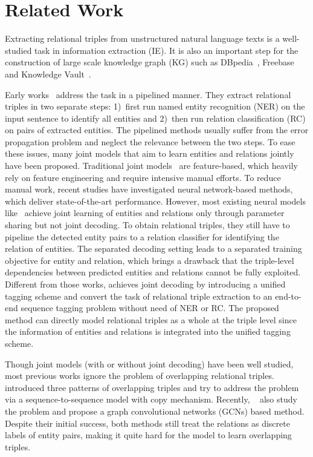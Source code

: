 \documentclass[11pt,a4paper]{article}
\begin{document}
 	
	\section{Related Work}
Extracting relational triples from unstructured natural language texts is a well-studied task in information extraction (IE). It is also an important step for the construction of large scale knowledge graph (KG) such as DBpedia~\citep{auer2007DBpedia}, Freebase~\citep{bollacker2008Freebase} and Knowledge Vault~\citep{dong2014Knowledge}.

\par Early works~\citep{mintz2009Distant,gormley2015Improved} address the task in a pipelined manner. They extract relational triples in two separate steps: 1)~first run named entity recognition (NER) on the input sentence to identify all entities and 2)~then run relation classification (RC) on pairs of extracted entities. The pipelined methods usually suffer from the error propagation problem and neglect the relevance between the two steps.
To ease these issues, many joint models that aim to learn entities and relations jointly have been proposed. Traditional joint models~\citep{yu2010Jointly,li2014Incremental,miwa2014Modeling,ren2017Cotype} are feature-based, which heavily rely on feature engineering and require intensive manual efforts. To reduce manual work, recent studies have investigated neural network-based methods, which deliver state-of-the-art performance. However, most existing neural models like~\citep{miwa2016End} achieve joint learning of entities and relations only through parameter sharing but not joint decoding. To obtain relational triples, they still have to pipeline the detected entity pairs to a relation classifier for identifying the relation of entities. The separated decoding setting leads to a separated training objective for entity and relation, which brings a drawback that the triple-level dependencies between predicted entities and relations cannot be fully exploited. Different from those works, \citet{zheng2017Joint} achieves joint decoding by introducing a unified tagging scheme and convert the task of relational triple extraction to an end-to-end sequence tagging problem without need of NER or RC. The proposed method can directly model relational triples as a whole at the triple level since the information of entities and relations is integrated into the unified tagging scheme.

\par Though joint models (with or without joint decoding) have been well studied, most previous works ignore the problem of overlapping relational triples. \citet{zeng2018Extracting} introduced three patterns of overlapping triples and try to address the problem via a sequence-to-sequence model with copy mechanism. Recently, ~\citet{fu2019GraphRel} also study the problem and propose a graph convolutional networks (GCNs) based method. Despite their initial success, both methods still treat the relations as discrete labels of entity pairs, making it quite hard for the model to learn overlapping triples.
\end{document}
